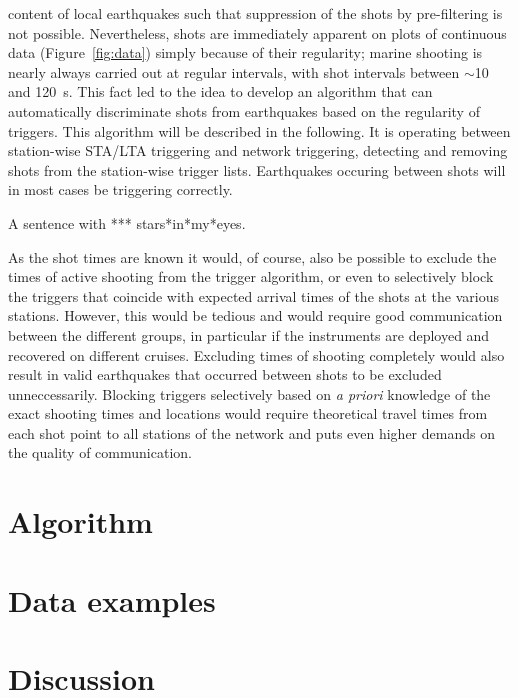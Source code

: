 \documentclass[11pt]{article}
\providecommand{\DIFadd}[1]{{\protect\color{blue}\uwave{#1}}} %
\providecommand{\DIFaddbegin}{} %
\providecommand{\DIFaddend}{} %
\begin{document}
content of local earthquakes such that suppression of the shots by %
pre-filtering is not possible.    Nevertheless, shots are immediately
apparent on plots of continuous data (Figure~\ref{fig:data})
simply because of their regularity; marine shooting is nearly always
carried out at regular intervals, with shot intervals between
$\sim$10 and 120~s.   This fact led to the idea to develop
an algorithm that can automatically discriminate shots from
earthquakes based on the regularity of triggers.  This algorithm will
be described in the following.  It is operating between station-wise STA/LTA
triggering and network triggering, detecting and removing shots from
the station-wise trigger lists.   Earthquakes occuring between shots
will in most cases be triggering correctly.

A sentence with *** stars*in*my*eyes.

  As the shot times are known it would, of course, also be possible to
  exclude the times of active shooting 
from the trigger algorithm, or even to selectively block the
triggers that coincide with expected arrival times of the shots at the
various stations.  However, this would be tedious and would require
good communication between the different groups, in particular if the
instruments are deployed and recovered on different cruises.
Excluding times of shooting completely would also result in valid
earthquakes that occurred between shots to be excluded
unneccessarily.  Blocking triggers selectively based on {\it a priori}
knowledge of the exact shooting times and locations would require theoretical travel times
from each shot point to all stations of the network and puts even
higher demands on the quality of communication.


\section{Algorithm}

\DIFaddbegin \begin{minipage}[b]{5cm}
\DIFadd{MINIPAGE
}\end{minipage}

\DIFaddend \section{Data examples}

\section{Discussion}
\end{document}
